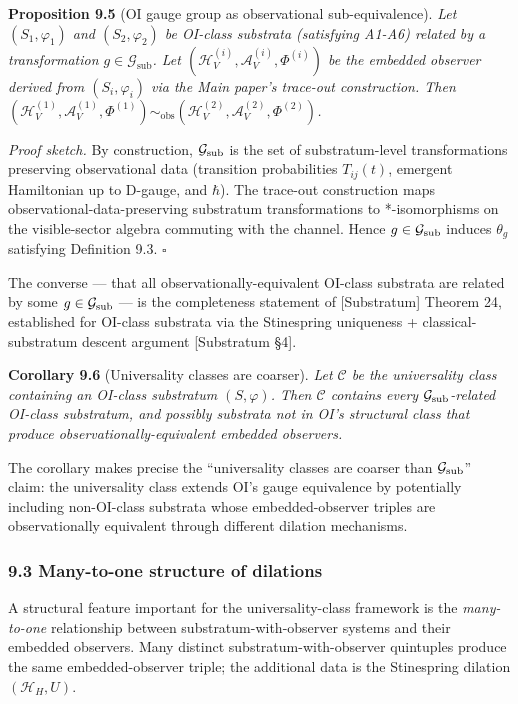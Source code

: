 \documentclass[
]{article}
\begin{document}
\textbf{Proposition 9.5} (OI gauge group as observational
sub-equivalence). \emph{Let \((S_1, \varphi_1)\) and
\((S_2, \varphi_2)\) be OI-class substrata (satisfying A1-A6) related by
a transformation \(g \in \mathcal{G}_{\mathrm{sub}}\). Let
\((\mathcal{H}_V^{(i)}, \mathcal{A}_V^{(i)}, \Phi^{(i)})\) be the
embedded observer derived from \((S_i, \varphi_i)\) via the Main paper's
trace-out construction. Then
\((\mathcal{H}_V^{(1)}, \mathcal{A}_V^{(1)}, \Phi^{(1)}) \sim_{\mathrm{obs}} (\mathcal{H}_V^{(2)}, \mathcal{A}_V^{(2)}, \Phi^{(2)})\).}

\emph{Proof sketch.} By construction, \(\mathcal{G}_{\rm sub}\) is the
set of substratum-level transformations preserving observational data
(transition probabilities \(T_{ij}(t)\), emergent Hamiltonian up to
D-gauge, and \(\hbar\)). The trace-out construction maps
observational-data-preserving substratum transformations to
*-isomorphisms on the visible-sector algebra commuting with the channel.
Hence \(g \in \mathcal{G}_{\rm sub}\) induces \(\theta_g\) satisfying
Definition 9.3. \(\square\)

The converse --- that all observationally-equivalent OI-class substrata
are related by some \(g \in \mathcal{G}_{\rm sub}\) --- is the
completeness statement of {[}Substratum{]} Theorem 24, established for
OI-class substrata via the Stinespring uniqueness + classical-substratum
descent argument {[}Substratum §4{]}.

\textbf{Corollary 9.6} (Universality classes are coarser). \emph{Let
\(\mathcal{C}\) be the universality class containing an OI-class
substratum \((S, \varphi)\). Then \(\mathcal{C}\) contains every
\(\mathcal{G}_{\rm sub}\)-related OI-class substratum, and possibly
substrata not in OI's structural class that produce
observationally-equivalent embedded observers.}

The corollary makes precise the ``universality classes are coarser than
\(\mathcal{G}_{\rm sub}\)'' claim: the universality class extends OI's
gauge equivalence by potentially including non-OI-class substrata whose
embedded-observer triples are observationally equivalent through
different dilation mechanisms.

\hypertarget{many-to-one-structure-of-dilations}{%
\subsubsection{9.3 Many-to-one structure of
dilations}\label{many-to-one-structure-of-dilations}}

A structural feature important for the universality-class framework is
the \emph{many-to-one} relationship between substratum-with-observer
systems and their embedded observers. Many distinct
substratum-with-observer quintuples produce the same embedded-observer
triple; the additional data is the Stinespring dilation
\((\mathcal{H}_H, U)\).
\end{document}
